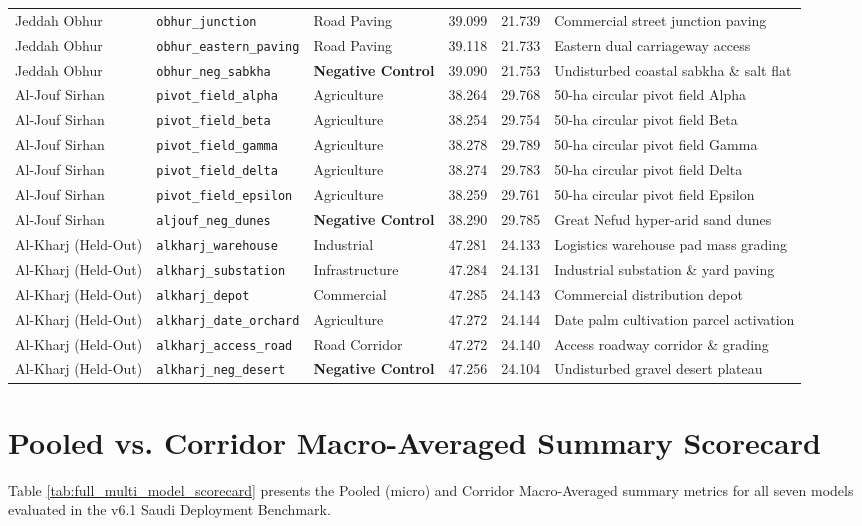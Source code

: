 \begin{longtable}{@{}lllrrp{4.2cm}@{}}
Jeddah Obhur & \texttt{obhur\_junction} & Road Paving & 39.099 & 21.739 & Commercial street junction paving \\
Jeddah Obhur & \texttt{obhur\_eastern\_paving}& Road Paving & 39.118 & 21.733 & Eastern dual carriageway access \\
Jeddah Obhur & \texttt{obhur\_neg\_sabkha} & \textbf{Negative Control} & 39.090 & 21.753 & Undisturbed coastal sabkha \& salt flat \\
\midrule
Al-Jouf Sirhan & \texttt{pivot\_field\_alpha} & Agriculture & 38.264 & 29.768 & 50-ha circular pivot field Alpha \\
Al-Jouf Sirhan & \texttt{pivot\_field\_beta} & Agriculture & 38.254 & 29.754 & 50-ha circular pivot field Beta \\
Al-Jouf Sirhan & \texttt{pivot\_field\_gamma} & Agriculture & 38.278 & 29.789 & 50-ha circular pivot field Gamma \\
Al-Jouf Sirhan & \texttt{pivot\_field\_delta} & Agriculture & 38.274 & 29.783 & 50-ha circular pivot field Delta \\
Al-Jouf Sirhan & \texttt{pivot\_field\_epsilon}& Agriculture & 38.259 & 29.761 & 50-ha circular pivot field Epsilon \\
Al-Jouf Sirhan & \texttt{aljouf\_neg\_dunes} & \textbf{Negative Control} & 38.290 & 29.785 & Great Nefud hyper-arid sand dunes \\
\midrule
Al-Kharj (Held-Out) & \texttt{alkharj\_warehouse}& Industrial & 47.281 & 24.133 & Logistics warehouse pad mass grading \\
Al-Kharj (Held-Out) & \texttt{alkharj\_substation}& Infrastructure & 47.284 & 24.131 & Industrial substation \& yard paving \\
Al-Kharj (Held-Out) & \texttt{alkharj\_depot} & Commercial & 47.285 & 24.143 & Commercial distribution depot \\
Al-Kharj (Held-Out) & \texttt{alkharj\_date\_orchard}& Agriculture & 47.272 & 24.144 & Date palm cultivation parcel activation \\
Al-Kharj (Held-Out) & \texttt{alkharj\_access\_road}& Road Corridor & 47.272 & 24.140 & Access roadway corridor \& grading \\
Al-Kharj (Held-Out) & \texttt{alkharj\_neg\_desert}& \textbf{Negative Control} & 47.256 & 24.104 & Undisturbed gravel desert plateau \\
\end{longtable}

\section{Pooled vs. Corridor Macro-Averaged Summary Scorecard}
\label{sec:complete_scorecard_table}
Table \ref{tab:full_multi_model_scorecard} presents the Pooled (micro) and Corridor Macro-Averaged summary metrics for all seven models evaluated in the v6.1 Saudi Deployment Benchmark.

